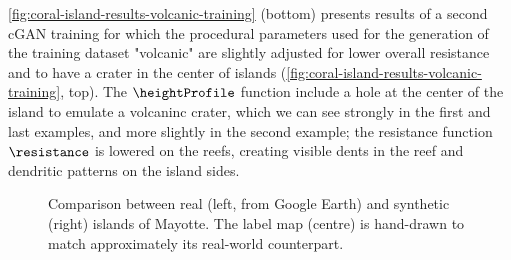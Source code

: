 \cref{fig:coral-island-results-volcanic-training} (bottom) presents results of a second cGAN training for which the procedural parameters used for the generation of the training dataset "volcanic" are slightly adjusted for lower overall resistance and to have a crater in the center of islands (\cref{fig:coral-island-results-volcanic-training}, top). The $\heightProfile$ function include a hole at the center of the island to emulate a volcaninc crater, which we can see strongly in the first and last examples, and more slightly in the second example; the resistance function $\resistance$ is lowered on the reefs, creating visible dents in the reef and dendritic patterns on the island sides.

\begin{figure}[tb]
    \caption[Comparison of  the cGAN output with Mayotte Island]{Comparison between real (left, from Google Earth) and synthetic (right) islands of Mayotte. The label map (centre) is hand-drawn to match approximately its real-world counterpart.}
    \label{fig:coral-island-example-Mayotte}
\end{figure}
